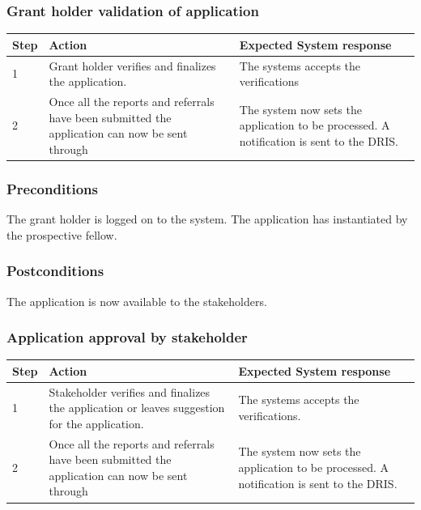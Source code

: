 \documentclass[12pt]{article}
\begin{document}
\subsubsection{Grant holder validation of application}

\begin{center}
\begin{tabular}{|l|p{6cm}|p{8cm}|}
\hline
Step & Action & Expected System response \\
\hline
1 & Grant holder verifies and finalizes the application. & The systems accepts the verifications \\
\hline
2 & Once all the reports and referrals have been submitted the application can now be sent through  & The system now sets the application to be processed. A notification is sent to the DRIS. \\
\hline
\end{tabular}
\end{center}

\subsubsection*{Preconditions}
The grant holder is logged on to the system. The application has instantiated by the prospective fellow.

\subsubsection*{Postconditions}
The application is now available to the stakeholders.

\subsubsection{Application approval by stakeholder}

\begin{center}
\begin{tabular}{|l|p{6cm}|p{8cm}|}
\hline
Step & Action & Expected System response \\
\hline
1 & Stakeholder verifies and finalizes the application or leaves suggestion for the application. & The systems accepts the verifications. \\
\hline
2 & Once all the reports and referrals have been submitted the application can now be sent through  & The system now sets the application to be processed. A notification is sent to the DRIS. \\
\hline
\end{tabular}
\end{center}
\end{document}

